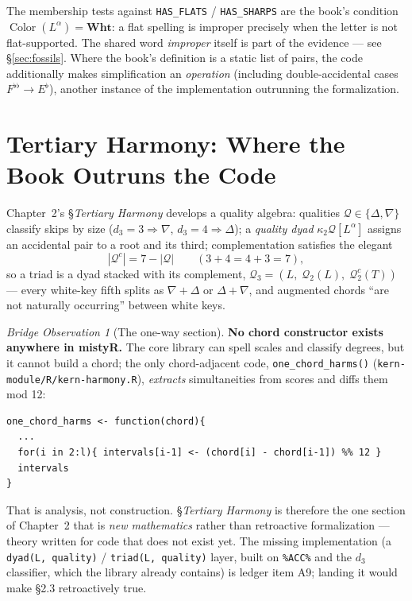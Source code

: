 \documentclass[11pt]{article}
\newcommand{\Maj}{\Delta}                       %
\newcommand{\Min}{\nabla}                       %
\newcommand{\Colorf}{\operatorname{Color}}
\theoremstyle{definition}
\theoremstyle{remark}
\newtheorem{bridge}{Bridge Observation}[section]
\newcommand{\code}[1]{\texttt{#1}}
\newcommand{\file}[1]{\texttt{#1}}
\begin{document}
The membership tests against \code{HAS\_FLATS} / \code{HAS\_SHARPS} are the
book's condition $\Colorf(L^{\alpha}) = \mathbf{Wht}$: a flat spelling is
improper precisely when the letter is not flat-supported. The shared word
\emph{improper} itself is part of the evidence --- see \S\ref{sec:fossils}.
Where the book's definition is a static list of pairs, the code additionally
makes simplification an \emph{operation} (including double-accidental cases
$F^{\flat\flat} \to E^{\flat}$), another instance of the implementation
outrunning the formalization.

\section{Tertiary Harmony: Where the Book Outruns the Code}\label{sec:harmony}

Chapter~2's \S\emph{Tertiary Harmony} develops a quality algebra: qualities
$\mathcal{Q} \in \{\Maj, \Min\}$ classify skips by size
($d_3 = 3 \Rightarrow \Min$, $d_3 = 4 \Rightarrow \Maj$); a \emph{quality dyad}
$\kappa_2 \mathcal{Q}[L^{\alpha}]$ assigns an accidental pair to a root and its
third; complementation satisfies the elegant
$$|\mathcal{Q}^c| = 7 - |\mathcal{Q}|
\qquad (3 + 4 = 4 + 3 = 7),$$
so a triad is a dyad stacked with its complement,
$\mathcal{Q}_3 = (L,\; \mathcal{Q}_2(L),\; \mathcal{Q}^c_2(T))$ --- every
white-key fifth splits as $\Min + \Maj$ or $\Maj + \Min$, and augmented chords
``are not naturally occurring'' between white keys.

\begin{bridge}[The one-way section]\label{obs:oneway}
\textbf{No chord constructor exists anywhere in mistyR.} The core library can
spell scales and classify degrees, but it cannot build a chord; the only
chord-adjacent code, \code{one\_chord\_harms()}
(\file{kern-module/R/kern-harmony.R}), \emph{extracts} simultaneities from
scores and diffs them mod 12:
\begin{lstlisting}
one_chord_harms <- function(chord){
  ...
  for(i in 2:l){ intervals[i-1] <- (chord[i] - chord[i-1]) %% 12 }
  intervals
}
\end{lstlisting}
That is analysis, not construction. \S\emph{Tertiary Harmony} is therefore the
one section of Chapter~2 that is \emph{new mathematics} rather than retroactive
formalization --- theory written for code that does not exist yet. The missing
implementation (a \code{dyad(L, quality)} / \code{triad(L, quality)} layer,
built on \code{\%ACC\%} and the $d_3$ classifier, which the library already
contains) is ledger item A9; landing it would make \S 2.3 retroactively true.
\end{bridge}
\end{document}
